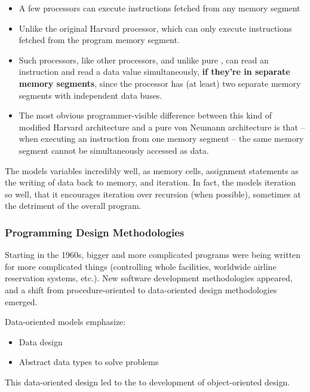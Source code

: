 \begin{definition}
\begin{remark}
\begin{itemize}[noitemsep]
      \begin{itemize}[noitemsep]
      \item A few  processors can execute instructions fetched from any memory segment
      \item Unlike the original Harvard processor, which can only execute instructions fetched from the program memory segment.
      \item Such processors, like other  processors, and unlike pure , can read an instruction and read a data value simultaneously, \textbf{if they're in separate memory segments}, since the processor has (at least) two separate memory segments with independent data buses.
      \item The most obvious programmer-visible difference between this kind of modified Harvard architecture and a pure von Neumann architecture is that – when executing an instruction from one memory segment – the same memory segment cannot be simultaneously accessed as data.
      \end{itemize}
    \end{itemize}
  \end{remark}
\end{definition}

The  models variables incredibly well, as memory cells, assignment statements as the writing of data back to memory, and iteration.
In fact, the  models iteration so well, that it encourages iteration over recursion (when possible), sometimes at the detriment of the overall program.

\subsubsection{Programming Design Methodologies}\label{subsubsec:Programming_Design_Methodologies}
Starting in the 1960s, bigger and more complicated programs were being written for more complicated things (controlling whole facilities, worldwide airline reservation systems, etc.).
New software development methodologies appeared, and a shift from procedure-oriented to data-oriented design methodologies emerged.

Data-oriented models emphasize:
\begin{itemize}[noitemsep]
\item Data design
\item Abstract data types to solve problems
\end{itemize}

This data-oriented design led to the to development of object-oriented design.
